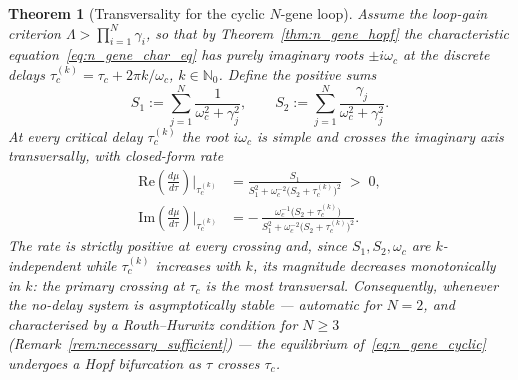 \documentclass[sn-mathphys,Numbered]{sn-jnl}
\theoremstyle{thmstyleone}
\newtheorem{theorem}{Theorem}
\theoremstyle{thmstyletwo}
\theoremstyle{thmstylethree}
\begin{document}
\begin{theorem}[Transversality for the cyclic $N$-gene loop]
\label{thm:n_gene_transversality}
Assume the loop-gain criterion $\Lambda>\prod_{i=1}^N\gamma_i$, so that
by Theorem~\ref{thm:n_gene_hopf} the characteristic
equation~\eqref{eq:n_gene_char_eq} has purely imaginary roots
$\pm i\omega_c$ at the discrete delays
$\tau_c^{(k)}=\tau_c+2\pi k/\omega_c$, $k\in\mathbb{N}_0$. Define the
positive sums
\begin{equation}
S_1:=\sum_{j=1}^N\frac{1}{\omega_c^{2}+\gamma_j^{2}},
\qquad
S_2:=\sum_{j=1}^N\frac{\gamma_j}{\omega_c^{2}+\gamma_j^{2}}.
\label{eq:n_gene_S1S2}
\end{equation}
At every critical delay $\tau_c^{(k)}$ the root $i\omega_c$ is simple
and crosses the imaginary axis transversally, with closed-form rate
\begin{equation}
\begin{aligned}
\mathrm{Re}\!\left(\frac{d\mu}{d\tau}\right)\!\bigg|_{\tau_c^{(k)}}
&=\frac{S_1}{S_1^{2}+\omega_c^{-2}\bigl(S_2+\tau_c^{(k)}\bigr)^{2}}
\;>\;0,\\[4pt]
\mathrm{Im}\!\left(\frac{d\mu}{d\tau}\right)\!\bigg|_{\tau_c^{(k)}}
&=-\,\frac{\omega_c^{-1}\bigl(S_2+\tau_c^{(k)}\bigr)}
        {S_1^{2}+\omega_c^{-2}\bigl(S_2+\tau_c^{(k)}\bigr)^{2}}.
\end{aligned}
\label{eq:n_gene_transversality}
\end{equation}
The rate is strictly positive at every crossing and, since
$S_1,S_2,\omega_c$ are $k$-independent while $\tau_c^{(k)}$ increases
with $k$, its magnitude decreases monotonically in $k$: the primary
crossing at $\tau_c$ is the most transversal. Consequently, whenever
the no-delay system is asymptotically stable --- automatic for $N=2$,
and characterised by a Routh--Hurwitz condition for $N\geq3$
(Remark~\ref{rem:necessary_sufficient}) --- the
equilibrium of~\eqref{eq:n_gene_cyclic} undergoes a Hopf bifurcation as
$\tau$ crosses $\tau_c$.
\end{theorem}
\end{document}
